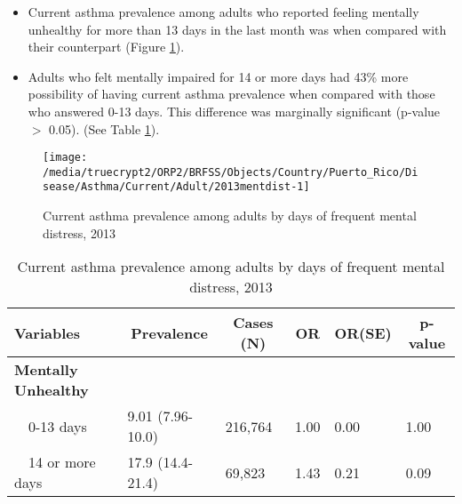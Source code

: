  \newpage
\begin{itemize}

\item Current asthma prevalence among adults who reported feeling mentally unhealthy for more than 13 days in the last month was  when compared with their counterpart (Figure \ref{fig:mental.Asthma.2013}).


\item  Adults who felt mentally impaired for 14 or more days had 43\% more possibility of having current asthma prevalence when compared with those who answered 0-13 days. This difference was marginally significant (p-value $>$ 0.05). (See Table \ref{tab:mental.Asthma.2013}).

\end{itemize}

\begin{figure}[H]
\centering
\caption{Current asthma prevalence among adults by days of frequent mental distress, 2013}
\label{fig:mental.Asthma.2013}

\begin{knitrout}
\color{fgcolor}

{\centering \texttt{[image: /media/truecrypt2/ORP2/BRFSS/Objects/Country/Puerto\_Rico/Disease/Asthma/Current/Adult/2013mentdist-1]} 

}



\end{knitrout}
 \end{figure}

\begin{table}[H]
\caption{Current asthma prevalence among adults by days of frequent mental distress, 2013\label{tab:mental.Asthma.2013}} 
\begin{center}
\begin{tabular}{llllll}
\hline\hline
\multicolumn{1}{l}{Variables}&\multicolumn{1}{c}{Prevalence}&\multicolumn{1}{c}{Cases (N)}&\multicolumn{1}{c}{OR}&\multicolumn{1}{c}{OR(SE)}&\multicolumn{1}{c}{p-value}\tabularnewline
\hline
{\bfseries Mentally Unhealthy}&&&&&\tabularnewline
~~0-13 days&9.01 (7.96-10.0)&216,764&1.00&0.00&1.00\tabularnewline
~~14 or more days&17.9 (14.4-21.4)& 69,823&1.43&0.21&0.09\tabularnewline
\hline
\end{tabular}\end{center}

\end{table}



